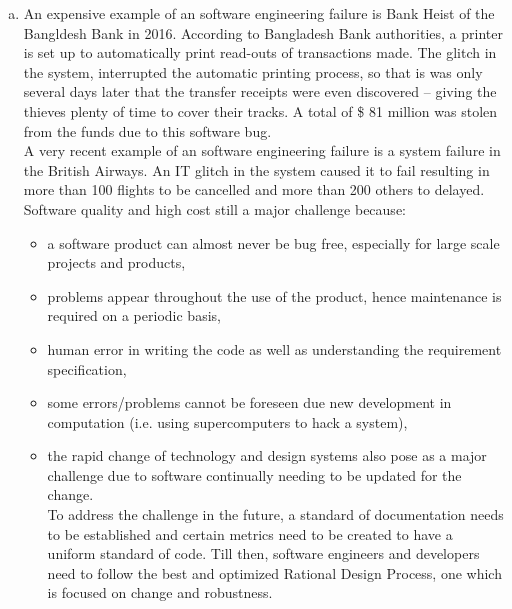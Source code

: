 \documentclass[12pt]{article}
\begin{document}
\begin{enumerate}[(d)]

\item An expensive example of an software engineering failure is Bank Heist of the Bangldesh Bank in 2016. According to Bangladesh Bank authorities, a printer is set up to automatically print read-outs of transactions made. The glitch in the system, interrupted the automatic printing process, so that is was only several days later that the transfer receipts were even discovered – giving the thieves plenty of time to cover their tracks. A total of \$ 81 million was stolen from the funds due to this software bug.\\

A very recent example of an software engineering failure is a system failure in the British Airways. An IT glitch in the system caused it to fail resulting in more than 100 flights to be cancelled and more than 200 others to delayed.\\

Software quality and high cost still a major challenge because:
\begin{itemize}

	\item a software product can almost never be bug free, especially for large scale projects and products,
	\item problems appear throughout the use of the product, hence maintenance is required on a periodic basis,
	\item human error in writing the code as well as understanding the requirement specification,
	\item some errors/problems cannot be foreseen due new development in computation (i.e. using supercomputers to hack a system),
	\item the rapid change of technology and design systems also pose as a major challenge due to software continually needing to be updated for the change.\\ 

To address the challenge in the future, a standard of documentation needs to be established and certain metrics need to be created to have a uniform standard of code. Till then, software engineers and developers need to follow the best and optimized Rational Design Process, one which is focused on change and robustness. 

\end{itemize}




\end{enumerate}
\end{document}
